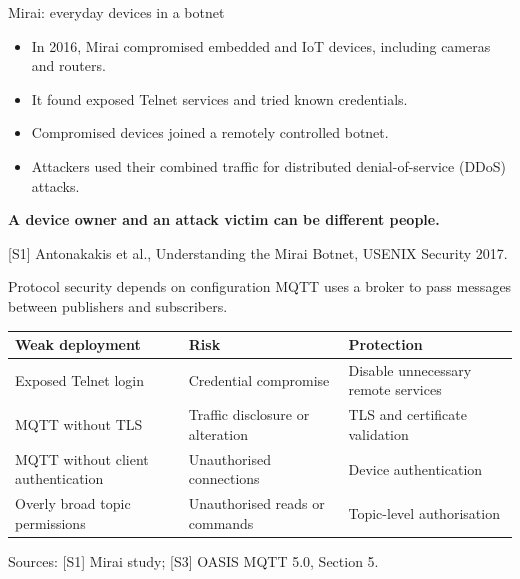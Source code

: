 \documentclass[aspectratio=169,12pt]{beamer}
\newcommand{\source}[1]{\par\vfill{\fontsize{6.5}{7.5}\selectfont\color{Muted}#1\par}}
\newcommand{\gap}{\par\vspace{2mm}}
\begin{document}
\begin{frame}{Mirai: everyday devices in a botnet}
\begin{itemize}
\item In 2016, Mirai compromised embedded and IoT devices,
including cameras and routers.
\item It found exposed Telnet services and tried known credentials.
\item Compromised devices joined a remotely controlled botnet.
\item Attackers used their combined traffic for distributed
denial-of-service (DDoS) attacks.
\end{itemize}
\gap
{\large\bfseries A device owner and an attack victim can be different people.}
\source{[S1] Antonakakis et al., Understanding the Mirai Botnet, USENIX Security 2017.}
\end{frame}

\begin{frame}{Protocol security depends on configuration}
\small
MQTT uses a broker to pass messages between publishers and subscribers.
\gap
\renewcommand{\arraystretch}{1.35}
\begin{tabularx}{\linewidth}{@{}YYY@{}}
\toprule
\textbf{Weak deployment} & \textbf{Risk} & \textbf{Protection}\\
\midrule
Exposed Telnet login & Credential compromise & Disable unnecessary remote services\\
MQTT without TLS & Traffic disclosure or alteration & TLS and certificate validation\\
MQTT without client authentication & Unauthorised connections & Device authentication\\
Overly broad topic permissions & Unauthorised reads or commands & Topic-level authorisation\\
\bottomrule
\end{tabularx}
\source{Sources: [S1] Mirai study; [S3] OASIS MQTT 5.0, Section 5.}
\end{frame}
\end{document}
